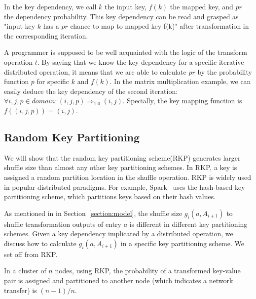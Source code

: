 \documentclass[10pt,journal,compsoc]{IEEEtran}
\begin{document}
In the key dependency, we call $k$ the input key, $f(k)$ the mapped key, 
and $pr$ the dependency probability.
This key dependency can be read and grasped as 
"input key $k$ has a $pr$ chance to map to mapped key f(k)" after transformation in the corresponding iteration. 

A programmer is supposed to be well acquainted with the logic of the transform operation $t$. 
By saying that we know the key dependency for a specific iterative distributed operation,
it means that we are able to calculate $pr$ by the probability function 
$p$ for specific $k$ and $f(k)$.
In the matrix multiplication example, we can easily deduce
the key dependency of the second iteration: 
$\forall i, j, p \in domain: (i, j, p) \Rightarrow_{1.0} (i, j)$.  
Specially, the key mapping function is $f((i, j, p)) = (i, j)$.


\subsection{Random Key Partitioning}\label{section:rkp}
We will show that the random key partitioning scheme(RKP) generates larger shuffle size than almost any other key partitioning schemes. 
In RKP, a key is assigned a random partition location in the shuffle operation. 
RKP is widely used in popular distributed paradigms.
For example, Spark~\cite{zaharia2012resilient} uses the hash-based key partitioning scheme, which partitions keys based on their hash values. 

As mentioned in in Section~\ref{section:model}, the shuffle size $g_i(a, A_{i+1})$ to shuffle transformation outputs of entry $a$ is different in different key partitioning schemes. 
Given a key dependency implicated by a distributed operation, we discuss how to calculate $g_i(a, A_{i+1})$ in a specific key partitioning scheme. 
We set off from RKP.


In a cluster of $n$ nodes, using RKP, the probability of a transformed key-value pair 
is assigned and partitioned to another node (which indicates a network transfer) is $(n-1)/n$.
\end{document}
